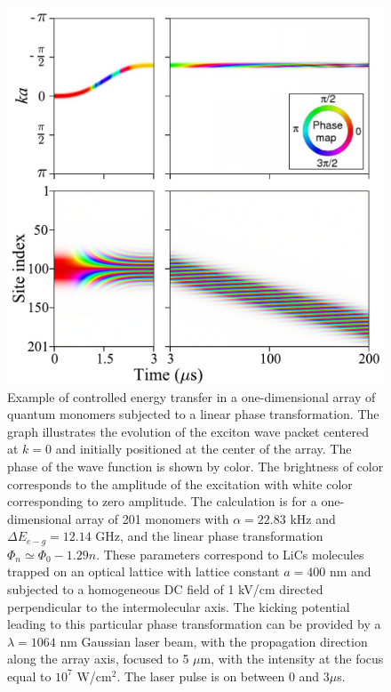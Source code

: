 \begin{figure}[htbp]
\centering
\includegraphics[width=\linewidth]{momentum-kick.pdf}
\caption{
Example of controlled energy transfer in a one-dimensional array of quantum 
monomers subjected to a linear phase transformation. The graph illustrates the evolution of the exciton wave packet  
 centered at $k=0$ and initially positioned at the center of the array. The phase of the wave function
is shown by color.  The brightness of color corresponds to the amplitude of the excitation with white color
 corresponding to zero amplitude. The calculation is for a one-dimensional array
of 201 monomers with $\alpha = 22.83$ kHz and $\Delta E_{e-g} =12.14$ GHz,  and the linear phase transformation 
$\Phi_n \simeq \Phi_0  -1.29 n$. These parameters correspond to LiCs molecules trapped on an optical lattice with lattice constant $a = 400$ nm and
 subjected to a homogeneous DC field of 1 kV/cm directed perpendicular to the
intermolecular axis. The kicking potential leading to this particular  phase transformation  can be provided by a
$\lambda = 1064$ nm Gaussian laser beam, with the propagation direction along the array axis, focused to 5 $\mu$m, 
with the intensity at the focus equal to $10^7$ W/cm$^2$. The laser pulse is on between 0 and  $3 \mu$s.}
\label{momentum-kick}
\end{figure}



